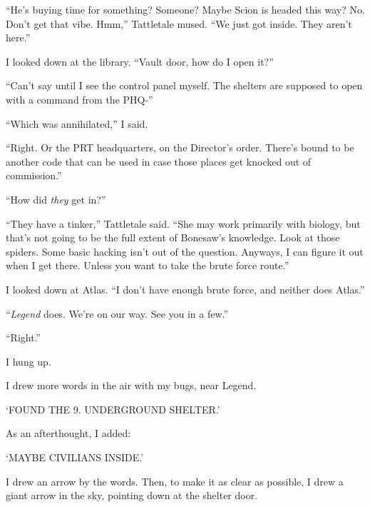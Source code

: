 ``He's buying time for something?  Someone?  Maybe Scion is headed this way?  No.  Don't get that vibe.  Hmm,'' Tattletale mused.  ``We just got inside.  They aren't here.''



I looked down at the library.  ``Vault door, how do I open it?''



``Can't say until I see the control panel myself.  The shelters are supposed to open with a command from the PHQ-''



``Which was annihilated,'' I said.



``Right.  Or the PRT headquarters, on the Director's order.  There's bound to be another code that can be used in case those places get knocked out of commission.''



``How did \emph{they} get in?''



``They have a tinker,'' Tattletale said.  ``She may work primarily with biology, but that's not going to be the full extent of Bonesaw's knowledge.  Look at those spiders.  Some basic hacking isn't out of the question.  Anyways, I can figure it out when I get there.  Unless you want to take the brute force route.''



I looked down at Atlas.  ``I don't have enough brute force, and neither does Atlas.''



``\emph{Legend} does.  We're on our way.  See you in a few.''



``Right.''



I hung up.



I drew more words in the air with my bugs, near Legend.



`FOUND THE 9.  UNDERGROUND SHELTER.'



As an afterthought, I added:



`MAYBE CIVILIANS INSIDE.'



I drew an arrow by the words.  Then, to make it as clear as possible, I drew a giant arrow in the sky, pointing down at the shelter door.



